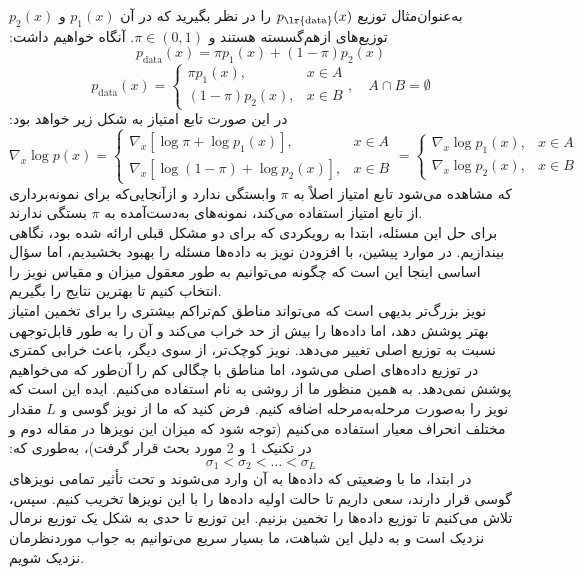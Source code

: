 \documentclass[12pt]{article}
\begin{document}
\begin{enumerate}
\begin{enumerate}
{        به‌عنوان‌مثال توزیع $p_{\text{\lr{data}}}(x)$ را در نظر بگیرید که در آن $p_1(x)$ و $p_2(x)$ توزیع‌های ازهم‌گسسته هستند و $\pi \in (0,1)$. آنگاه خواهیم داشت:
        $$
        p_{\text{data}}(x) = \pi p_1(x) + (1-\pi)p_2(x)
        $$
        $$
        p_{\text{data}}(x) =
        \begin{cases}
        \pi p_1(x), & x \in A\\
        (1-\pi) p_2(x), & x \in B
        \end{cases}, \quad A \cap B = \emptyset
        $$
        در این صورت تابع امتیاز به شکل زیر خواهد بود:
        $$
        \nabla_x \log p(x) =
        \begin{cases}
        \nabla_x [\log \pi + \log p_1(x)], & x \in A\\
        \nabla_x [\log (1-\pi) + \log p_2(x)], & x \in B
        \end{cases} =
        \begin{cases}
        \nabla_x \log p_1(x), & x \in A\\
        \nabla_x \log p_2(x), & x \in B
        \end{cases}
        $$
        که مشاهده می‌شود تابع امتیاز اصلاً به $\pi$ وابستگی ندارد و ازآنجایی‌که  برای نمونه‌برداری از تابع امتیاز استفاده می‌کند، نمونه‌های به‌دست‌آمده به $\pi$ بستگی ندارند.\\  
        برای حل این مسئله، ابتدا به رویکردی که برای دو مشکل قبلی ارائه شده بود، نگاهی بیندازیم. در موارد پیشین، با افزودن نویز به داده‌ها مسئله را بهبود بخشیدیم، اما سؤال اساسی اینجا این است که چگونه می‌توانیم به طور معقول میزان و مقیاس نویز را انتخاب کنیم تا بهترین نتایج را بگیریم.\\ 
        نویز بزرگ‌تر بدیهی است که می‌تواند مناطق کم‌تراکم بیشتری را برای تخمین امتیاز بهتر پوشش دهد، اما داده‌ها را بیش از حد خراب می‌کند و آن را به طور قابل‌توجهی نسبت به توزیع اصلی تغییر می‌دهد. نویز کوچک‌تر، از سوی دیگر، باعث خرابی کمتری در توزیع داده‌های اصلی می‌شود، اما مناطق با چگالی کم را آن‌طور که می‌خواهیم پوشش نمی‌دهد. به همین منظور ما از روشی به نام  استفاده می‌کنیم.  
        ایده  این است که نویز را به‌صورت مرحله‌به‌مرحله اضافه کنیم. فرض کنید که ما از نویز گوسی و $L$ مقدار مختلف انحراف معیار استفاده می‌کنیم (توجه شود که میزان این نویزها در مقاله دوم و در تکنیک 1 و 2 مورد بحث قرار گرفت)، به‌طوری که:
        $$
        \sigma_1 < \sigma_2 < \dots < \sigma_L
        $$
        در ابتدا، ما با وضعیتی که داده‌ها به آن وارد می‌شوند و تحت تأثیر تمامی نویزهای گوسی قرار دارند، سعی داریم تا حالت اولیه داده‌ها را با این نویزها تخریب کنیم. سپس، تلاش می‌کنیم تا توزیع داده‌ها را تخمین بزنیم. این توزیع تا حدی به شکل یک توزیع نرمال نزدیک است و به دلیل این شباهت، ما بسیار سریع می‌توانیم به جواب موردنظرمان نزدیک شویم.\\
}
\end{enumerate}
\end{enumerate}
\end{document}
